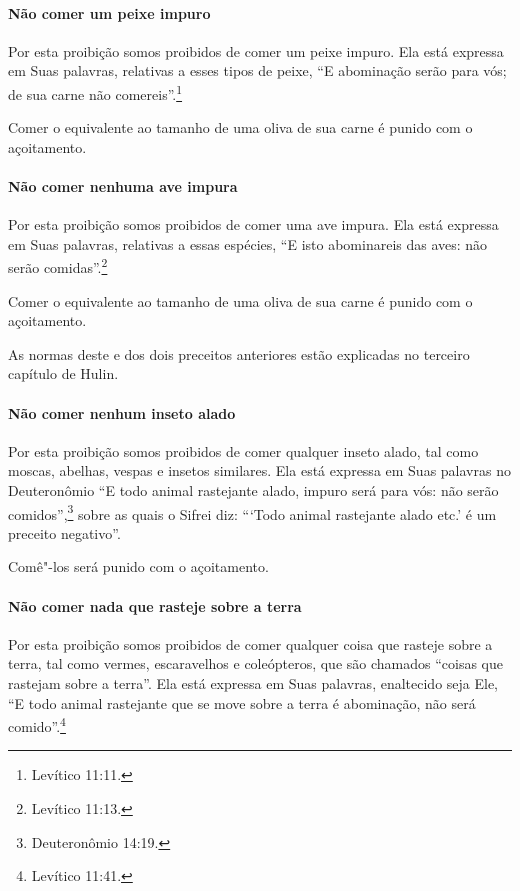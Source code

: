 \begin{multicols}{2}
\paragraph{Não comer um peixe impuro}

Por esta proibição somos proibidos de comer um peixe impuro. Ela está
expressa em Suas palavras, relativas a esses tipos de peixe, ``E
abominação serão para vós; de sua carne não comereis''.\footnote{Levítico 11:11.}

Comer o equivalente ao tamanho de uma oliva de sua carne é punido com o
açoitamento.

\paragraph{Não comer nenhuma ave impura}

Por esta proibição somos proibidos de comer uma ave impura. Ela está
expressa em Suas palavras, relativas a essas espécies, ``E isto
abominareis das aves: não serão comidas''.\footnote{Levítico 11:13.}

Comer o equivalente ao tamanho de uma oliva de sua carne é punido com o
açoitamento.

As normas deste e dos dois preceitos anteriores estão explicadas no
terceiro capítulo de Hulin\starr.

\paragraph{Não comer nenhum inseto alado}

Por esta proibição somos proibidos de comer qualquer inseto alado, tal
como moscas, abelhas, vespas e insetos similares. Ela está expressa em
Suas palavras no Deuteronômio ``E todo animal rastejante alado, impuro
será para vós: não serão comidos'',\footnote{Deuteronômio 14:19.} sobre as quais
o Sifrei\starr{} diz: ```Todo animal rastejante alado etc.' é um preceito
negativo''.

Comê"-los será punido com o açoitamento.

\paragraph{Não comer nada que rasteje sobre a terra}

Por esta proibição somos proibidos de comer qualquer coisa que rasteje
sobre a terra, tal como vermes, escaravelhos e coleópteros, que são
chamados ``coisas que rastejam sobre a terra''. Ela está expressa em
Suas palavras, enaltecido seja Ele, ``E todo animal rastejante que se
move sobre a terra é abominação, não será comido''.\footnote{Levítico 11:41.}


\end{multicols}
